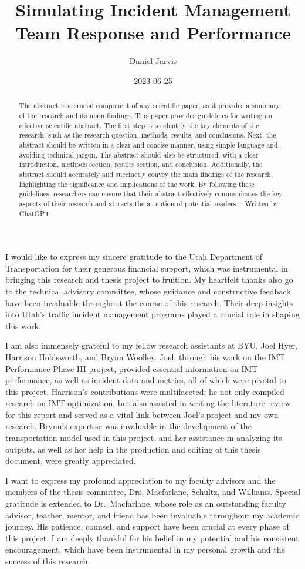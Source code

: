 \documentclass[fancy, oneside, mastersfancy, ms]{byuthesis}
\title{Simulating Incident Management Team Response and Performance}
\author{Daniel Jarvis}
\date{2023-06-25}
\begin{document}
\frontmatter
\titlepage
\cleardoublepage

\customtitlepage
\cleardoublepage


  \begin{abstract}
The abstract is a crucial component of any scientific paper, as it
provides a summary of the research and its main findings. This paper
provides guidelines for writing an effective scientific abstract. The
first step is to identify the key elements of the research, such as the
research question, methods, results, and conclusions. Next, the abstract
should be written in a clear and concise manner, using simple language
and avoiding technical jargon. The abstract should also be structured,
with a clear introduction, methods section, results section, and
conclusion. Additionally, the abstract should accurately and succinctly
convey the main findings of the research, highlighting the significance
and implications of the work. By following these guidelines, researchers
can ensure that their abstract effectively communicates the key aspects
of their research and attracts the attention of potential readers. -
Written by ChatGPT
\end{abstract}
\cleardoublepage

\begin{acknowledgments}
I would like to express my sincere gratitude to the Utah Department of
Transportation for their generous financial support, which was
instrumental in bringing this research and thesis project to fruition.
My heartfelt thanks also go to the technical advisory committee, whose
guidance and constructive feedback have been invaluable throughout the
course of this research. Their deep insights into Utah's traffic
incident management programs played a crucial role in shaping this work.

I am also immensely grateful to my fellow research assistants at BYU,
Joel Hyer, Harrison Holdsworth, and Brynn Woolley. Joel, through his
work on the IMT Performance Phase III project, provided essential
information on IMT performance, as well as incident data and metrics,
all of which were pivotal to this project. Harrison's contributions were
multifaceted; he not only compiled research on IMT optimization, but
also assisted in writing the literature review for this report and
served as a vital link between Joel's project and my own research.
Brynn's expertise was invaluable in the development of the
transportation model used in this project, and her assistance in
analyzing its outputs, as well as her help in the production and editing
of this thesis document, were greatly appreciated.

I want to express my profound appreciation to my faculty advisors and
the members of the thesis committee, Drs. Macfarlane, Schultz, and
Williams. Special gratitude is extended to Dr.~Macfarlane, whose role as
an outstanding faculty advisor, teacher, mentor, and friend has been
invaluable throughout my academic journey. His patience, counsel, and
support have been crucial at every phase of this project. I am deeply
thankful for his belief in my potential and his consistent
encouragement, which have been instrumental in my personal growth and
the success of this research.
\end{acknowledgments}
\cleardoublepage
\end{document}
